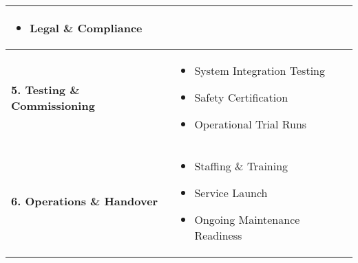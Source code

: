 \begin{center}
\begin{tabularx}{\textwidth}{|@{ \ }L{7.6cm} C{7.595cm}@{}|}
\begin{itemize}[leftmargin=*, nosep]
		  \item Legal \& Compliance
		\end{itemize}\vspace*{9pt} \\
		\hline
		\textbf{5. Testing \& Commissioning} &\vspace*{9pt}
		\begin{itemize}[leftmargin=*, nosep]
		  \item System Integration Testing
		  \item Safety Certification
		  \item Operational Trial Runs
		\end{itemize}\vspace*{9pt} \\
		\hline
		\textbf{6. Operations \& Handover} &\vspace*{9pt}
		\begin{itemize}[leftmargin=*, nosep]
		  \item Staffing \& Training
		  \item Service Launch
		  \item Ongoing Maintenance Readiness
		\end{itemize} \vspace*{9pt}\\
		\hline
	\end{tabularx}

\end{center}  \par
